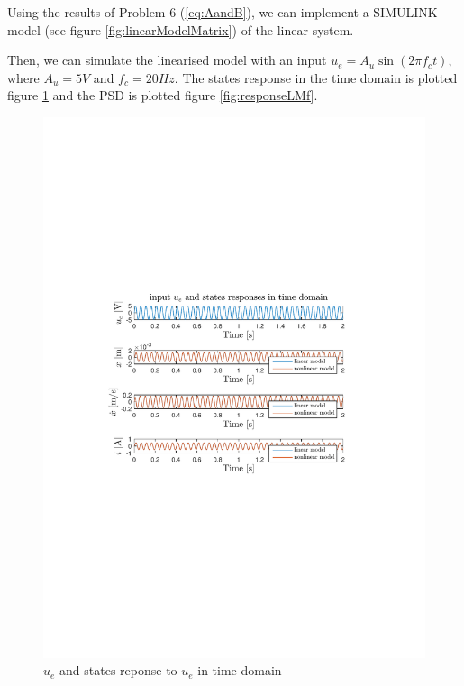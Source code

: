 Using the results of Problem 6 (\ref{eq:AandB}), we can implement a SIMULINK model (see figure \ref{fig:linearModelMatrix}) of the linear system.

Then, we can simulate the linearised model with an input $u_e=A_u\sin(2\pi f_ct)$, where $A_u=5V$ and $f_c=20Hz$. The states response in the time domain is plotted figure \ref{fig:responseLMt} and the PSD is plotted figure \ref{fig:responseLMf}.

\begin{figure}[H]
 \centering 
\includegraphics[trim=2cm 7cm 2cm 7cm, clip=true, totalheight=0.35\textheight, angle=0]{figures/p9time.pdf}
\caption{$u_e$ and states reponse to $u_e$ in time domain}
\label{fig:responseLMt}
\end{figure}
